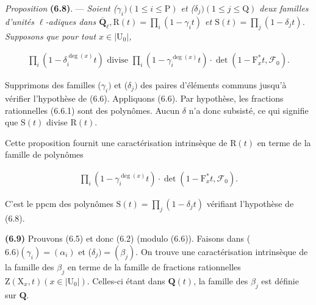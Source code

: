 \documentclass[10pt,leqno]{article}
\begin{document}
\noindent \emph{Proposition} \textbf{(6.8)}. — {\itshape Soient (\(\gamma _{i}) (1\leq i\leq \mathrm{P})\) et (\(\delta _{j}) (1\leq j\leq \mathrm{Q})\) deux familles d’unités \(\ell \)-adiques dans \(\overline{\mathbf{Q}}_{\ell }, \mathrm{R}(t)=\prod _{i}(1- \gamma _{i} t)\) et \(\mathrm{S}(t)=\prod _{j}(1- \delta _{j} t)\). Supposons que pour tout \(x\in |\mathrm{U}_{0}|\),}\par

\begin{equation*}\begin{gathered}\prod _{i}(1- \delta _{i}^{\operatorname{deg}(x)}t)\text{ divise }\prod _{i}(1- \gamma _{i}^{\operatorname{deg}(x)}t)\cdot \operatorname{det}(1- \mathrm{F}_{x}^{*}t,\mathcal{F} _{0}).\end{gathered}\end{equation*}

\par

\noindent Supprimons des familles (\(\gamma _{i})\) et (\(\delta _{j})\) des paires d’éléments communs jusqu’à vérifier l’hypothèse de (6.6). Appliquons (6.6). Par hypothèse, les fractions rationnelles (6.6.1) sont des polynômes. Aucun \(\delta \) n’a donc subsisté, ce qui signifie que \(\mathrm{S}(t)\) divise \(\mathrm{R}(t)\).\par

\noindent Cette proposition fournit une caractérisation intrinsèque de \(\mathrm{R}(t)\) en terme de la famille de polynômes\par

\begin{equation*}\begin{gathered}\prod _{i}(1- \gamma _{i}^{\operatorname{deg}(x)}t)\cdot \operatorname{det}(1- \mathrm{F}_{x}^{*}t,\mathcal{F} _{0}).\end{gathered}\end{equation*}

\noindent C’est le ppcm des polynômes \(\mathrm{S}(t)=\prod _{j}(1- \delta _{j} t)\) vérifiant l’hypothèse de (6.8).\par

\noindent \textbf{(6.9)} Prouvons (6.5) et donc (6.2) (modulo (6.6)). Faisons dans (\(6.6) (\gamma _{i})=(\alpha _{i})\) et (\(\delta _{j})=(\beta _{j})\). On trouve une caractérisation intrinsèque de la famille des \(\beta _{j}\) en terme de la famille de fractions rationnelles \(\mathrm{Z}(\mathrm{X}_{x},t) (x\in |\mathrm{U}_{0}|)\). Celles-ci étant dans \(\mathbf{Q}(t)\), la famille des \(\beta _{j}\) est définie sur \(\mathbf{Q}\).\par
\end{document}
